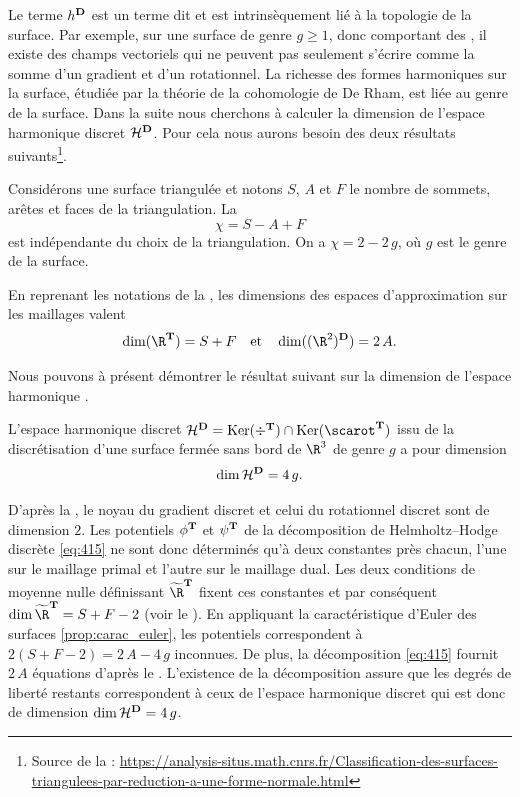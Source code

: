 Le terme $h^{\mathbf{D}}$ est un terme dit  et est intrinsèquement lié à la topologie de la surface. Par exemple, sur une surface de genre $g \geqslant 1$, donc comportant des , il existe des champs vectoriels qui ne peuvent pas seulement s'écrire comme la somme d'un gradient et d'un rotationnel. La richesse des formes harmoniques sur la surface, étudiée par la théorie de la cohomologie de De Rham, est liée au genre de la surface. Dans la suite nous cherchons à calculer la dimension de l'espace harmonique discret $\mathcal{H}^{\mathbf{D}}$. Pour cela nous aurons besoin des deux résultats suivants\footnote{Source de la  : \url{https://analysis-situs.math.cnrs.fr/Classification-des-surfaces-triangulees-par-reduction-a-une-forme-normale.html}}.
\begin{prop} \label{prop:carac_euler}
Considérons une surface triangulée et notons $S$, $A$ et $F$ le nombre de sommets, arêtes et faces de la triangulation. La 
\[
\chi = S - A + F
\]
est indépendante du choix de la triangulation. On a $\chi = 2 - 2 \, g$, où $g$ est le genre de la surface.
\end{prop}

\begin{corol} \label{lemme:dim_sfa}
En reprenant les notations de la , les dimensions des espaces d'approximation sur les maillages \ddfv valent
\[
\dim(\R^\ensddfvplat) = S + F
\quad
\text{et}
\quad
\dim((\R^2)^\ensdiamantplat) = 2 \, A.
\]
\end{corol}
Nous pouvons à présent démontrer le résultat suivant sur la dimension de l'espace harmonique \ddfv.
\begin{prop}
L'espace harmonique discret $\mathcal{H}^\ensdiamantplat = \Ker(\div^\ensddfvplat) \cap \Ker(\scarot^\ensddfvplat)$ issu de la discrétisation \ddfv d'une surface fermée sans bord de $\R^3$ de genre $g$ a pour dimension 
\[
\dim \mathcal{H}^{\mathbf{D}} = 4 \, g.
\]
\end{prop}
\begin{demo}
D'après la , le noyau du gradient discret et celui du rotationnel discret sont de dimension $2$. Les potentiels $\phi^{\mathbf{T}}$ et $\psi^{\mathbf{T}}$ de la décomposition de Helmholtz--Hodge discrète \ref{eq:415} ne sont donc déterminés qu'à deux constantes près chacun, l'une sur le maillage primal et l'autre sur le maillage dual. Les deux conditions de moyenne nulle définissant $\Rddfvmn$ fixent ces constantes et par conséquent $\dim \Rddfvmn = S + F - 2$ (voir le ). En appliquant la caractéristique d'Euler des surfaces \ref{prop:carac_euler}, les potentiels correspondent à $2(S + F - 2) = 2 \, A - 4 \, g$ inconnues. De plus, la décomposition \ref{eq:415} fournit $2 \, A$ équations d'après le . L'existence de la décomposition assure que les degrés de liberté restants correspondent à ceux de l'espace harmonique discret qui est donc de dimension $\dim \mathcal{H}^{\mathbf{D}} = 4 \, g$.
\end{demo}


